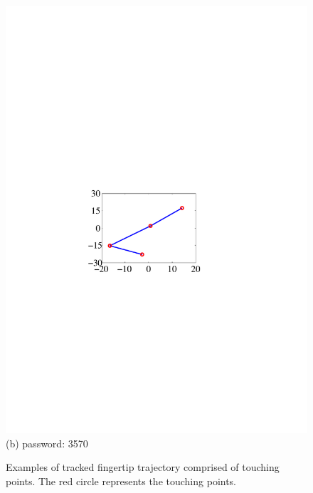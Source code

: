 \begin{figure}[!t]
{\begin{minipage}[t]{0.22\textwidth}
                \includegraphics[width=\textwidth]{fig/pin_3570.pdf}\\
                \centering  (b) password: 3570
             \end{minipage}
        }
        \caption{Examples of tracked fingertip trajectory comprised of touching points. The red circle represents the touching points.}
        \label{fig:pins_trajectory}
    \end{figure}

